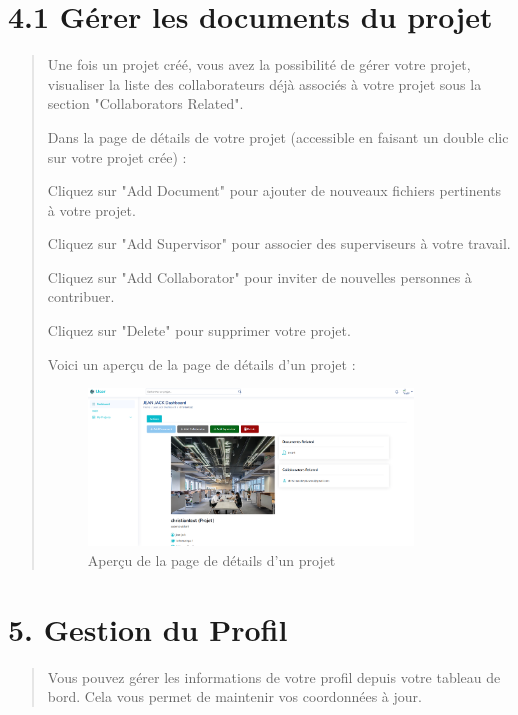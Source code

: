 \documentclass[a4paper,12pt]{article}
\begin{document}
\section*{4.1 Gérer les documents du projet}
\begin{quote}
Une fois un projet créé, vous avez la possibilité de gérer votre projet, visualiser la liste des collaborateurs déjà associés à votre projet sous la section "Collaborators Related".

Dans la page de détails de votre projet (accessible en faisant un double clic sur votre projet crée) :

Cliquez sur "Add Document" pour ajouter de nouveaux fichiers pertinents à votre projet.

Cliquez sur "Add Supervisor" pour associer des superviseurs à votre travail.

Cliquez sur "Add Collaborator" pour inviter de nouvelles personnes à contribuer.

Cliquez sur "Delete" pour supprimer votre projet.

Voici un aperçu de la page de détails d’un projet :

\begin{figure}[H]
\centering
\includegraphics[width=0.85\textwidth]{IMAGES/details-projet.png}
\caption{Aperçu de la page de détails d’un projet}
\label{fig:detailprojet}
\end{figure}

\end{quote}

\section*{5. Gestion du Profil}
\begin{quote}
Vous pouvez gérer les informations de votre profil depuis votre tableau de bord. Cela vous permet de maintenir vos coordonnées à jour.
\end{quote}
\end{document}
